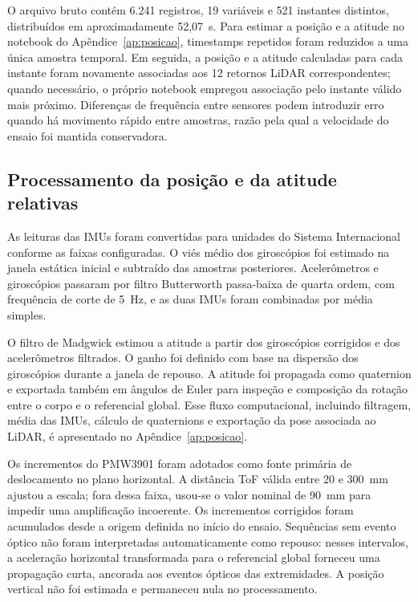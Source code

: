 O arquivo bruto contém 6.241 registros, 19 variáveis e 521 instantes distintos, distribuídos em aproximadamente 52,07~s. Para estimar a posição e a atitude no notebook do Apêndice~\ref{ap:posicao}, timestamps repetidos foram reduzidos a uma única amostra temporal. Em seguida, a posição e a atitude calculadas para cada instante foram novamente associadas aos 12 retornos LiDAR correspondentes; quando necessário, o próprio notebook empregou associação pelo instante válido mais próximo. Diferenças de frequência entre sensores podem introduzir erro quando há movimento rápido entre amostras, razão pela qual a velocidade do ensaio foi mantida conservadora.

\subsection{Processamento da posição e da atitude relativas}

As leituras das IMUs foram convertidas para unidades do Sistema Internacional conforme as faixas configuradas. O viés médio dos giroscópios foi estimado na janela estática inicial e subtraído das amostras posteriores. Acelerômetros e giroscópios passaram por filtro Butterworth passa-baixa de quarta ordem, com frequência de corte de 5~Hz, e as duas IMUs foram combinadas por média simples.

O filtro de Madgwick estimou a atitude a partir dos giroscópios corrigidos e dos acelerômetros filtrados. O ganho foi definido com base na dispersão dos giroscópios durante a janela de repouso. A atitude foi propagada como quaternion e exportada também em ângulos de Euler para inspeção e composição da rotação entre o corpo e o referencial global. Esse fluxo computacional, incluindo filtragem, média das IMUs, cálculo de quaternions e exportação da pose associada ao LiDAR, é apresentado no Apêndice~\ref{ap:posicao}.

Os incrementos do PMW3901 foram adotados como fonte primária de deslocamento no plano horizontal. A distância ToF válida entre 20 e 300~mm ajustou a escala; fora dessa faixa, usou-se o valor nominal de 90~mm para impedir uma amplificação incoerente. Os incrementos corrigidos foram acumulados desde a origem definida no início do ensaio. Sequências sem evento óptico não foram interpretadas automaticamente como repouso: nesses intervalos, a aceleração horizontal transformada para o referencial global forneceu uma propagação curta, ancorada aos eventos ópticos das extremidades. A posição vertical não foi estimada e permaneceu nula no processamento.

